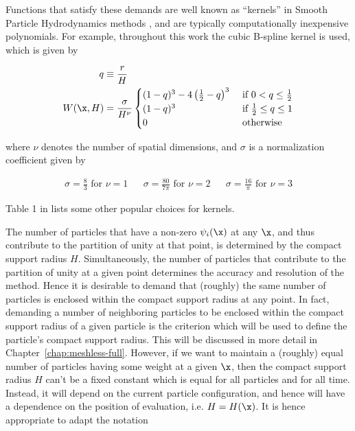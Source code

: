 Functions that satisfy these demands are well known as ``kernels'' in Smooth Particle
Hydrodynamics methods \citep[e.g.][]{monaghanSmoothedParticleHydrodynamics1992,
priceSmoothedParticleHydrodynamics2012}, and are typically computationally inexpensive
polynomials. For example, throughout this work the cubic B-spline kernel
\citep{monaghanRefinedParticleMethod1985} is used, which is given by

\begin{align}
    q &\equiv \frac{r}{H} \\
    W(\x, H) &= \frac{\sigma}{H^\nu}
        \begin{cases}
            (1 - q)^3 - 4\left(\frac{1}{2} - q \right)^3
                & \text{ if } 0 < q \leq \frac{1}{2} \\
            (1 - q)^3
                & \text{ if } \frac{1}{2} \leq q \leq 1 \\
            0 & \text{ otherwise }
        \end{cases}
    \label{eq:cubic-spline-kernel}
\end{align}

where $\nu$ denotes the number of spatial dimensions, and $\sigma$ is a normalization coefficient
given by

\begin{align}
    \sigma = \frac{8}{3} \text{ for } \nu = 1 &&
    \sigma = \frac{80}{7 \pi} \text{ for } \nu = 2 &&
    \sigma = \frac{16}{\pi} \text{ for } \nu = 3
\end{align}



Table 1 in \cite{dehnenImprovingConvergenceSmoothed2012c} lists some other popular choices for
kernels.

The number of particles that have a non-zero $\psi_i(\x)$  at any $\x$, and thus contribute to the
partition of unity at that point, is determined by the compact support radius $H$. Simultaneously,
the number of particles that contribute to the partition of unity at a given point determines the
accuracy and resolution of the method. Hence it is desirable to demand that (roughly) the same
number of particles is enclosed within the compact support radius at any point. In fact, demanding
a number of neighboring particles to be enclosed within the compact support radius of a given
particle is the criterion which will be used to define the particle's compact support radius. This
will be discussed in more detail in Chapter~\ref{chap:meshless-full}. However, if we want to
maintain a (roughly) equal number of particles having some weight at a given $\x$, then the compact
support radius $H$ can't be a fixed constant which is equal for all particles and for all time.
Instead, it will depend on the current particle configuration, and hence will have a dependence on
the position of evaluation, i.e. $H = H(\x)$.  It is hence appropriate to adapt the notation

